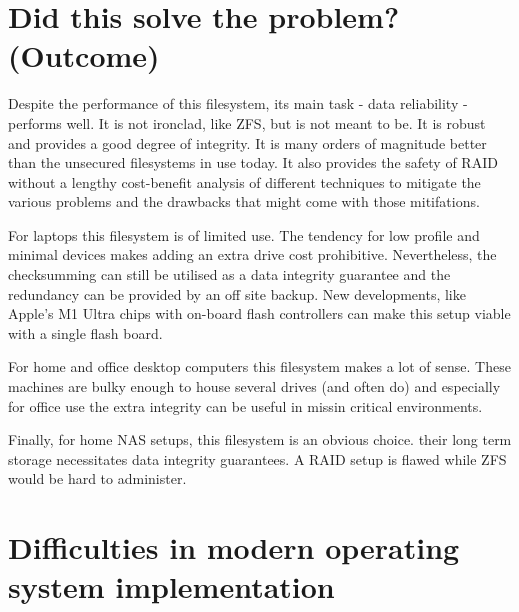 
    \section{Did this solve the problem? (Outcome)}

        Despite the performance of this filesystem, its main task - data
        reliability - performs well. It is not ironclad, like ZFS, but is not
        meant to be. It is robust and provides a good degree of integrity. It
        is many orders of magnitude better than the unsecured filesystems in
        use today. It also provides the safety of RAID without a lengthy
        cost-benefit analysis of different techniques to mitigate the various
        problems and the drawbacks that might come with those mitifations.

        For laptops this filesystem is of limited use. The tendency for low
        profile and minimal devices makes adding an extra drive cost
        prohibitive.  Nevertheless, the checksumming can still be utilised as a
        data integrity guarantee and the redundancy can be provided by an off
        site backup. New developments, like Apple's M1 Ultra chips with
        on-board flash controllers \cite{m1_ultra_controller} can make this
        setup viable with a single flash board.

        For home and office desktop computers this filesystem makes a lot of
        sense. These machines are bulky enough to house several drives (and
        often do) and especially for office use the extra integrity can be
        useful in missin critical environments.

        Finally, for home NAS setups, this filesystem is an obvious choice.
        their long term storage necessitates data integrity guarantees. A RAID
        setup is flawed while ZFS would be hard to administer.


    \section{Difficulties in modern operating system implementation}


